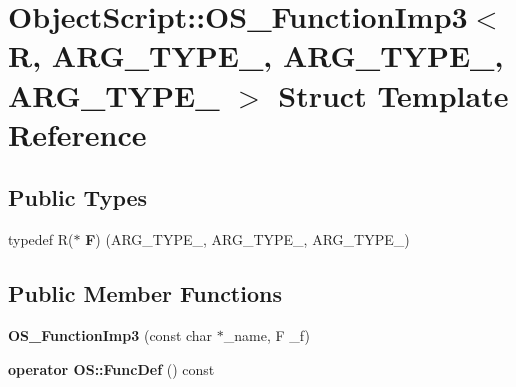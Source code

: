 \hypertarget{struct_object_script_1_1_o_s___function_imp3}{}\section{Object\+Script\+:\+:O\+S\+\_\+\+Function\+Imp3$<$ R, A\+R\+G\+\_\+\+T\+Y\+P\+E\+\_, A\+R\+G\+\_\+\+T\+Y\+P\+E\+\_, A\+R\+G\+\_\+\+T\+Y\+P\+E\+\_ $>$ Struct Template Reference}
\label{struct_object_script_1_1_o_s___function_imp3}
\subsection*{Public Types}
\begin{DoxyCompactItemize}
\item 
typedef R($\ast$ {\bfseries F}) (A\+R\+G\+\_\+\+T\+Y\+P\+E\+\_, A\+R\+G\+\_\+\+T\+Y\+P\+E\+\_, A\+R\+G\+\_\+\+T\+Y\+P\+E\+\_)\hypertarget{struct_object_script_1_1_o_s___function_imp3_a89c9c8670b82295ffc77865570c35114}{}\label{struct_object_script_1_1_o_s___function_imp3_a89c9c8670b82295ffc77865570c35114}

\end{DoxyCompactItemize}
\subsection*{Public Member Functions}
\begin{DoxyCompactItemize}
\item 
{\bfseries O\+S\+\_\+\+Function\+Imp3} (const char $\ast$\+\_\+name, F \+\_\+f)\hypertarget{struct_object_script_1_1_o_s___function_imp3_a2c9ced5438b138a3c258267d72d721ee}{}\label{struct_object_script_1_1_o_s___function_imp3_a2c9ced5438b138a3c258267d72d721ee}

\item 
{\bfseries operator O\+S\+::\+Func\+Def} () const \hypertarget{struct_object_script_1_1_o_s___function_imp3_a86473e80616e0c3134de08139dc2a876}{}\label{struct_object_script_1_1_o_s___function_imp3_a86473e80616e0c3134de08139dc2a876}

\end{DoxyCompactItemize}
